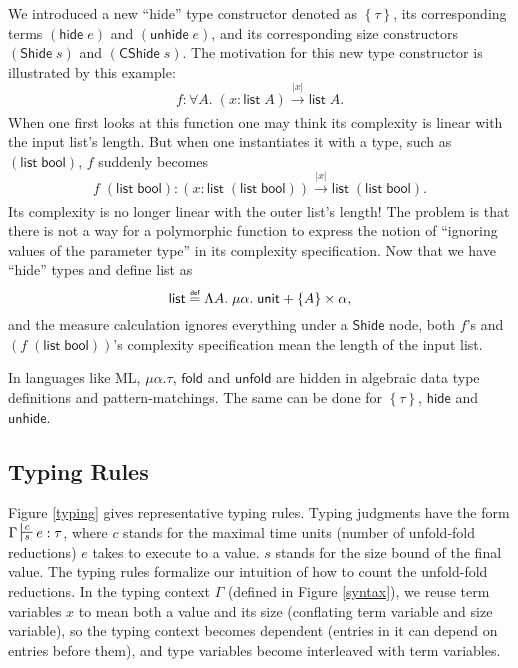 \documentclass[preprint]{sigplanconf}
\newcommand{\thide}[1]{\left \{ #1 \right \}}
\newcommand{\typing}[4]{\sststile{#4}{#3}#1:#2}
\newcommand{\arrow}[4]{#1\xrightarrow[#3]{#2}#4}
\newcommand{\symfold}{\mathsf{fold}}
\newcommand{\symunfold}{\mathsf{unfold}}
\newcommand{\symhide}{\mathsf{hide}}
\newcommand{\symShide}{\mathsf{Shide}}
\newcommand{\symunhide}{\mathsf{unhide}}
\newcommand{\symunit}{\mathsf{unit}}
\newcommand{\symlist}{\mathsf{list}}
\newcommand{\symbool}{\mathsf{bool}}
\newcommand{\symCShide}{\mathsf{CShide}}
\newcommand{\intro}[2]{(#1 : #2)}
\newcommand\defeq{\mathrel{\overset{\makebox[0pt]{\mbox{\normalfont\tiny\sffamily def}}}{=}}}
\begin{document}
We introduced a new ``hide'' type constructor denoted as $\thide{\tau}$, its corresponding terms $(\symhide\; e)$ and $(\symunhide\; e)$, and its corresponding size constructors $(\symShide\;s)$ and $(\symCShide\;s)$. The motivation for this new type constructor is illustrated by this example: 
$$f:\forall A.\;\arrow{\intro{x}{\symlist\;A}}{|x|}{}{\symlist\;A}.$$
When one first looks at this function one may think its complexity is linear with the input list's length. But when one instantiates it with a type, such as $(\symlist\;\symbool)$, $f$ suddenly becomes 
$$f\;(\symlist\;\symbool):\arrow{\intro{x}{\symlist\;(\symlist\;\symbool)}}{|x|}{}{\symlist\;(\symlist\;\symbool)}.$$
Its complexity is no longer linear with the outer list's length! The problem is that there is not a way for a polymorphic function to express the notion of ``ignoring values of the parameter type'' in its complexity specification. Now that we have ``hide'' types and define list as 
$$\symlist \defeq \Lambda A.\;\mu \alpha.\;\symunit + \thide{A} \times \alpha,$$ 
and the measure calculation ignores everything under a $\symShide$ node, both $f$'s and $(f\;(\symlist\;\symbool))$'s complexity specification mean the length of the input list.

In languages like ML, $\mu\alpha.\tau$, $\symfold$ and $\symunfold$ are hidden in algebraic data type definitions and pattern-matchings. The same can be done for $\thide{\tau}$, $\symhide$ and $\symunhide$.

\subsection{Typing Rules}

Figure \ref{typing} gives representative typing rules. Typing judgments have the form $\Gamma\typing{e}{\tau}{c}{s}$, where $c$ stands for the maximal time units (number of unfold-fold reductions) $e$ takes to execute to a value. $s$ stands for the size bound of the final value. The typing rules formalize our intuition of how to count the unfold-fold reductions. In the typing context $\Gamma$ (defined in Figure \ref{syntax}), we reuse term variables $x$ to mean both a value and its size (conflating term variable and size variable), so the typing context becomes dependent (entries in it can depend on entries before them), and type variables become interleaved with term variables. 
\end{document}
